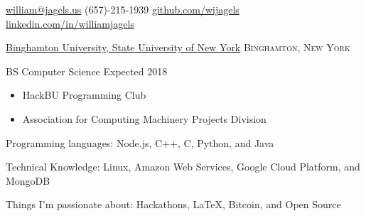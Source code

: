 \documentclass[11pt]{article}
\begin{document}


\nobreakvspace{0.3em}  %

\noindent\href{mailto:william@jagels.us}{william@jagels.us}\sbull
(657)-215-1939\sbull
\href{https://github.com/wijagels}{github.com/wijagels}\sbull
\href{https://www.linkedin.com/in/williamjagels}{linkedin.com/in/williamjagels}



\spacedhrule{0.1em}{0.9em}  %

\headedsection
{\href{http://www.binghamton.edu/index.php}{Binghamton University, State University of New York}}
{\textsc{Binghamton, New York}} {
    \headedsubsection
    {BS Computer Science}
    {Expected 2018}
    {
        \begin{itemize}
            \item HackBU Programming Club
            \item Association for Computing Machinery Projects Division
        \end{itemize}
    }
}



\spacedhrule{0.1em}{0.9em}  %

\inlineheadsection  %
{Programming languages:}
{ Node.js, C++, C, Python, and Java }


\inlineheadsection
{Technical Knowledge:}
{ Linux, Amazon Web Services, Google Cloud Platform, and MongoDB}

\inlineheadsection
{Things I'm passionate about:}
{Hackathons, \LaTeX, Bitcoin, and Open Source}




\spacedhrule{0.1em}{0.9em}  %
\end{document}
